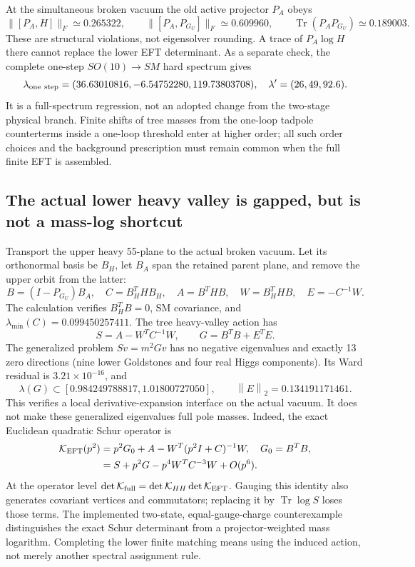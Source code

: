 \documentclass[11pt]{article}
\newcommand{\tr}{\operatorname{Tr}}
\newcommand{\norm}[1]{\left\lVert#1\right\rVert_2}
\begin{document}
At the simultaneous broken vacuum the old active projector $P_A$ obeys
\begin{equation}
 \lVert[P_A,H]\rVert_F\simeq0.265322,\qquad
 \lVert[P_A,P_{G_U}]\rVert_F\simeq0.609960,
 \qquad\tr(P_A P_{G_U})\simeq0.189003.
\end{equation}
These are structural violations, not eigensolver rounding. A trace of
$P_A\log H$ there cannot replace the lower EFT determinant.
As a separate check, the complete one-step $SO(10)\to SM$ hard spectrum gives
\begin{equation}
 \lambda_{\rm one\ step}=(36.63010816,-6.54752280,119.73803708),
 \quad\lambda'=(26,49,92.6).
\end{equation}
It is a full-spectrum regression, not an adopted change from the two-stage
physical branch. Finite shifts of tree masses from the one-loop tadpole
counterterms inside a one-loop threshold enter at higher order; all such
order choices and the background prescription must remain common when the
full finite EFT is assembled.

\subsection{The actual lower heavy valley is gapped, but is not a mass-log shortcut}
Transport the upper heavy 55-plane to the actual broken vacuum. Let its
orthonormal basis be $B_H$, let $B_A$ span the retained parent plane, and
remove the upper orbit from the latter:
\begin{equation}
B=(I-P_{G_U})B_A,\quad C=B_H^THB_H,\quad
A=B^THB,\quad W=B_H^THB,\quad E=-C^{-1}W.
\end{equation}
The calculation verifies $B_H^TB=0$, SM covariance, and
$\lambda_{\min}(C)=0.099450257411$. The tree heavy-valley action has
\begin{equation}
S=A-W^TC^{-1}W,\qquad G=B^TB+E^TE.
\end{equation}
The generalized problem $Sv=m^2Gv$ has no negative eigenvalues and exactly
13 zero directions (nine lower Goldstones and four real Higgs components).
Its Ward residual is $3.21\times10^{-16}$, and
\begin{equation}
\lambda(G)\subset[0.984249788817,1.01800727050],\qquad
\norm{E}=0.134191171461.
\end{equation}
This verifies a local derivative-expansion interface on the actual vacuum.
It does not make these generalized eigenvalues full pole masses. Indeed,
the exact Euclidean quadratic Schur operator is
\begin{align}
\mathcal K_{\rm EFT}(p^2)
 &=p^2G_0+A-W^T(p^2I+C)^{-1}W,\quad G_0=B^TB,\\
 &=S+p^2G-p^4W^TC^{-3}W+O(p^6).
\end{align}
At the operator level
$\det\mathcal K_{\rm full}=\det\mathcal K_{HH}\det\mathcal K_{\rm EFT}$.
Gauging this identity also generates covariant vertices and commutators;
replacing it by $\tr\log S$ loses those terms. The implemented
two-state, equal-gauge-charge counterexample distinguishes the exact Schur
determinant from a projector-weighted mass logarithm. Completing the lower
finite matching means using the induced action, not merely another spectral
assignment rule.
\end{document}
